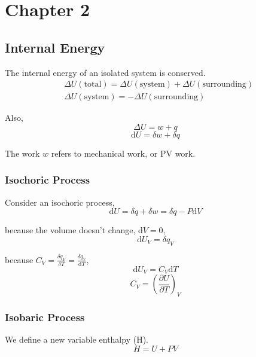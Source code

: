 \documentclass[letterpaper]{article}
\newcommand{\diff}{\mathrm{d}}
\begin{document}
\newpage
\section*{Chapter 2}
\subsection*{Internal Energy}
The internal energy of an isolated system is conserved.
\begin{equation*}
    \begin{aligned}
         & \Delta U(\mathrm{total})=\Delta U(\mathrm{system})+\Delta U(\mathrm{surrounding}) \\
         & \Delta U(\mathrm{system})=-\Delta U(\mathrm{surrounding})
    \end{aligned}
\end{equation*}

Also,
\begin{equation*}
    \Delta U=w+q
\end{equation*}
\begin{equation*}
    \diff U=\delta w+\delta q
\end{equation*}

The work $w$ refers to mechanical work, or PV work.
\subsubsection*{Isochoric Process}
Consider an isochoric process,
\begin{equation*}
    \diff U=\delta q + \delta w = \delta q - P\diff V
\end{equation*}

because the volume doesn't change, d$V=0$,
\begin{equation*}
    \diff U_V=\delta q_V
\end{equation*}

because $C_V=\frac{\delta q_V}{\delta T}=\frac{\delta q_V}{\diff T}$,
\begin{equation*}
    \diff U_V=C_V\diff T
\end{equation*}
\begin{equation*}
    \boxed{C_V=(\frac{\partial U}{\partial T})_V}
\end{equation*}
\subsubsection*{Isobaric Process}
We define a new variable enthalpy (H).
\begin{equation*}
    H=U+PV
\end{equation*}
\end{document}

